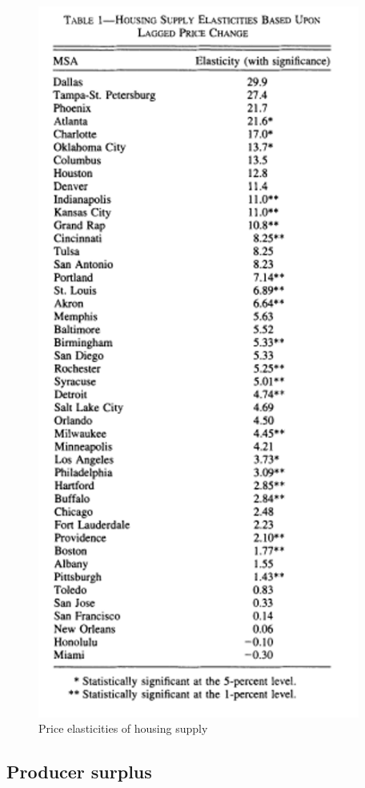 \documentclass[
]{book}
\begin{document}
\begin{figure}

{\centering \includegraphics[width=400px]{./figures/green} 

}

\caption{Price elasticities of housing supply }\label{fig:green}
\end{figure}

\hypertarget{producer-surplus}{%
\subsection{Producer surplus}\label{producer-surplus}}
\end{document}
